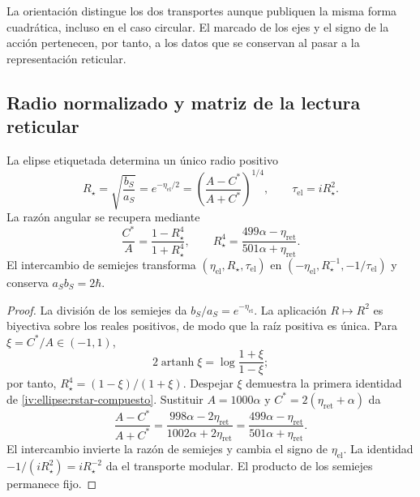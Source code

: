 La orientación distingue los dos transportes aunque publiquen
la misma forma cuadrática, incluso en el caso circular.
El marcado de los ejes y el signo de la acción pertenecen,
por tanto, a los datos que se conservan al pasar a la
representación reticular.

\subsection{Radio normalizado y matriz de la lectura reticular}
\label{iv:ellipse:radio}

\begin{proposition}
\label{iv:ellipse:radio-prop}
La elipse etiquetada determina un único radio positivo
\begin{equation}
 R_\star=\sqrt{\frac{b_S}{a_S}}
 =e^{-\eta_{\mathrm{el}}/2}
 =\left(\frac{A-C^*}{A+C^*}\right)^{1/4},
 \qquad \tau_{\mathrm{el}}=iR_\star^2.
 \label{iv:ellipse:rstar}
\end{equation}
La razón angular se recupera mediante
\begin{equation}
 \frac{C^*}{A}=\frac{1-R_\star^4}{1+R_\star^4},
 \qquad
 R_\star^4=
 \frac{499\alpha-\eta_{\mathrm{ret}}}
      {501\alpha+\eta_{\mathrm{ret}}}.
 \label{iv:ellipse:rstar-compuesto}
\end{equation}
El intercambio de semiejes transforma
\((\eta_{\mathrm{el}},R_\star,\tau_{\mathrm{el}})\) en
\((-\eta_{\mathrm{el}},R_\star^{-1},-1/\tau_{\mathrm{el}})\)
y conserva \(a_Sb_S=2\hbar\).
\end{proposition}
\begin{proof}
La división de los semiejes da \(b_S/a_S=e^{-\eta_{\mathrm{el}}}\).
La aplicación \(R\mapsto R^2\) es biyectiva sobre los reales
positivos, de modo que la raíz positiva es única.
Para \(\xi=C^*/A\in(-1,1)\),
\[
 2\operatorname{artanh}\xi
 =\log\frac{1+\xi}{1-\xi};
\]
por tanto, \(R_\star^4=(1-\xi)/(1+\xi)\).
Despejar \(\xi\) demuestra la primera identidad de
\eqref{iv:ellipse:rstar-compuesto}. Sustituir
\(A=1000\alpha\) y
\(C^*=2(\eta_{\mathrm{ret}}+\alpha)\) da
\[
 \frac{A-C^*}{A+C^*}
 =\frac{998\alpha-2\eta_{\mathrm{ret}}}
        {1002\alpha+2\eta_{\mathrm{ret}}}
 =\frac{499\alpha-\eta_{\mathrm{ret}}}
        {501\alpha+\eta_{\mathrm{ret}}}.
\]
El intercambio invierte la razón de semiejes y cambia el
signo de \(\eta_{\mathrm{el}}\). La identidad
\(-1/(iR_\star^2)=iR_\star^{-2}\) da el transporte
modular. El producto de los semiejes permanece fijo.
\end{proof}

